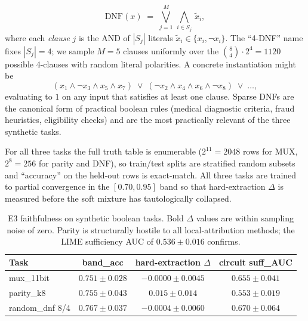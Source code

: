 \documentclass{article}
\begin{document}
\begin{itemize}
\begin{equation*}
          \text{DNF}(x) \;=\; \bigvee_{j=1}^{M}\, \bigwedge_{i \in S_j}\, \tilde{x}_i,
        \end{equation*}
        where each \emph{clause} $j$ is the AND of $|S_j|$ literals $\tilde{x}_i \in \{x_i, \neg x_i\}$. The ``4-DNF'' name fixes $|S_j| = 4$; we sample $M = 5$ clauses uniformly over the $\binom{8}{4} \cdot 2^4 = 1120$ possible 4-clauses with random literal polarities. A concrete instantiation might be
        \begin{equation*}
          (x_1 \land \neg x_3 \land x_5 \land x_7) \;\lor\; (\neg x_2 \land x_4 \land x_6 \land \neg x_8) \;\lor\; \ldots,
        \end{equation*}
        evaluating to $1$ on any input that satisfies at least one clause. Sparse DNFs are the canonical form of practical boolean rules (medical diagnostic criteria, fraud heuristics, eligibility checks) and are the most practically relevant of the three synthetic tasks.
\end{itemize}
For all three tasks the full truth table is enumerable ($2^{11} = 2048$ rows for MUX, $2^{8} = 256$ for parity and DNF), so train/test splits are stratified random subsets and ``accuracy'' on the held-out rows is exact-match.
All three tasks are trained to partial convergence in the $[0.70, 0.95]$ band so that hard-extraction $\Delta$ is measured before the soft mixture has tautologically collapsed.

\begin{table}[H]
\centering
\caption{E3 faithfulness on synthetic boolean tasks. Bold $\Delta$ values are within sampling noise of zero. Parity is structurally hostile to all local-attribution methods; the LIME sufficiency AUC of $0.536 \pm 0.016$ confirms.}
\label{tab:e3}
\begin{tabular}{lccc}
\toprule
\textbf{Task} & \textbf{band\_acc} & \textbf{hard-extraction $\Delta$} & \textbf{circuit suff\_AUC} \\
\midrule
mux\_11bit       & $0.751 \pm 0.028$ & $\mathbf{-0.0000 \pm 0.0045}$ & $0.655 \pm 0.041$ \\
parity\_k8       & $0.755 \pm 0.043$ & $0.015 \pm 0.014$            & $0.553 \pm 0.019$ \\
random\_dnf 8/4  & $0.767 \pm 0.037$ & $\mathbf{-0.0004 \pm 0.0060}$ & $0.670 \pm 0.064$ \\
\bottomrule
\end{tabular}
\end{table}
\end{document}
